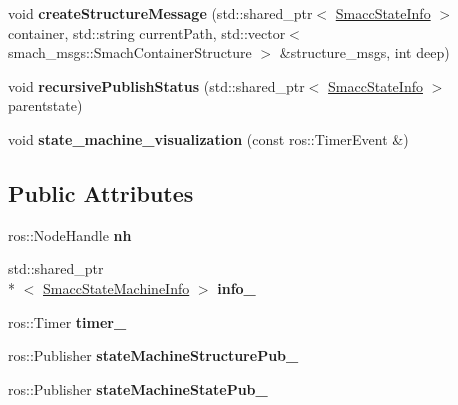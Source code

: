 \begin{DoxyCompactItemize}
\item 
\hypertarget{structsmacc_1_1SmaccStateMachineBase_ada55ce7b64579bd74f79302f3d587624}{void {\bfseries create\-Structure\-Message} (std\-::shared\-\_\-ptr$<$ \hyperlink{classsmacc_1_1SmaccStateInfo}{Smacc\-State\-Info} $>$ container, std\-::string current\-Path, std\-::vector$<$ smach\-\_\-msgs\-::\-Smach\-Container\-Structure $>$ \&structure\-\_\-msgs, int deep)}\label{structsmacc_1_1SmaccStateMachineBase_ada55ce7b64579bd74f79302f3d587624}

\item 
\hypertarget{structsmacc_1_1SmaccStateMachineBase_a5c078ef0eec2c64ecd9a31b46341b13c}{void {\bfseries recursive\-Publish\-Status} (std\-::shared\-\_\-ptr$<$ \hyperlink{classsmacc_1_1SmaccStateInfo}{Smacc\-State\-Info} $>$ parentstate)}\label{structsmacc_1_1SmaccStateMachineBase_a5c078ef0eec2c64ecd9a31b46341b13c}

\item 
\hypertarget{structsmacc_1_1SmaccStateMachineBase_afcee04fc4d307b31d7d0fac932d7d90f}{void {\bfseries state\-\_\-machine\-\_\-visualization} (const ros\-::\-Timer\-Event \&)}\label{structsmacc_1_1SmaccStateMachineBase_afcee04fc4d307b31d7d0fac932d7d90f}

\end{DoxyCompactItemize}
\subsection*{Public Attributes}
\begin{DoxyCompactItemize}
\item 
\hypertarget{structsmacc_1_1SmaccStateMachineBase_a191b29227e32c440c936ac05359e9cd5}{ros\-::\-Node\-Handle {\bfseries nh}}\label{structsmacc_1_1SmaccStateMachineBase_a191b29227e32c440c936ac05359e9cd5}

\item 
\hypertarget{structsmacc_1_1SmaccStateMachineBase_a9b28c1933560c98b33444c68c278f8a5}{std\-::shared\-\_\-ptr\\*
$<$ \hyperlink{classsmacc_1_1SmaccStateMachineInfo}{Smacc\-State\-Machine\-Info} $>$ {\bfseries info\-\_\-}}\label{structsmacc_1_1SmaccStateMachineBase_a9b28c1933560c98b33444c68c278f8a5}

\item 
\hypertarget{structsmacc_1_1SmaccStateMachineBase_a7fc7227a0c6321cf7253683a1f38c4f8}{ros\-::\-Timer {\bfseries timer\-\_\-}}\label{structsmacc_1_1SmaccStateMachineBase_a7fc7227a0c6321cf7253683a1f38c4f8}

\item 
\hypertarget{structsmacc_1_1SmaccStateMachineBase_af586b32d0f79caba26c2dbca76a55767}{ros\-::\-Publisher {\bfseries state\-Machine\-Structure\-Pub\-\_\-}}\label{structsmacc_1_1SmaccStateMachineBase_af586b32d0f79caba26c2dbca76a55767}

\item 
\hypertarget{structsmacc_1_1SmaccStateMachineBase_a7c76e7a7d6c00d9831472297ff51e38c}{ros\-::\-Publisher {\bfseries state\-Machine\-State\-Pub\-\_\-}}\label{structsmacc_1_1SmaccStateMachineBase_a7c76e7a7d6c00d9831472297ff51e38c}

\end{DoxyCompactItemize}


